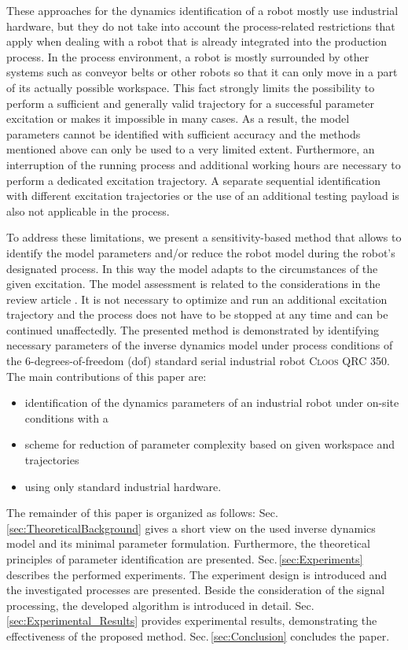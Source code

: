 These approaches for the dynamics identification of a robot mostly use industrial hardware, but they do not take into account the process-related restrictions that apply when dealing with a robot that is already integrated into the production process. 
In the process environment, a robot is mostly surrounded by other systems such as conveyor belts or other robots so that it can only move in a part of its actually possible workspace. This fact strongly limits the possibility to perform a sufficient and generally valid trajectory for a successful parameter excitation or makes it impossible in many cases. As a result, the model parameters cannot be identified with sufficient accuracy and the methods mentioned above can only be used to a very limited extent. 
Furthermore, an interruption of the running process and additional working hours are necessary to perform a dedicated excitation trajectory. 
A separate sequential identification with different excitation trajectories or the use of an additional testing payload is also not applicable in the process.

To address these limitations, we present a sensitivity-based method that allows to identify the model parameters and/or reduce the robot model during the robot's designated process. In this way the model adapts to the circumstances of the given excitation. The model assessment is related to the considerations in the review article \cite{Guyon2003}. It is not necessary to optimize and run an additional excitation trajectory and the process does not have to be stopped at any time and can be continued unaffectedly. 
The presented method is demonstrated by identifying necessary parameters of the inverse dynamics model under process conditions of the 6-degrees-of-freedom (dof) standard serial industrial robot \textsc{Cloos QRC 350}. 
The main contributions of this paper are:
\begin{itemize}
    \item identification of the dynamics parameters of an industrial robot under on-site conditions with a
    \item scheme for reduction of parameter complexity based on given workspace and trajectories
    \item using only standard industrial hardware.
\end{itemize}

The remainder of this paper is organized as follows: Sec.\,\ref{sec:TheoreticalBackground} gives a short view on the used inverse dynamics model and its minimal parameter formulation. Furthermore, the theoretical principles of parameter identification are presented. Sec.\,\ref{sec:Experiments} describes the performed experiments. 
The experiment design is introduced and the investigated processes are presented. 
Beside the consideration of the signal processing, the developed algorithm is introduced in detail.
Sec.\,\ref{sec:Experimental_Results} provides experimental results, demonstrating the effectiveness of the proposed method. Sec.\,\ref{sec:Conclusion} concludes the paper.
